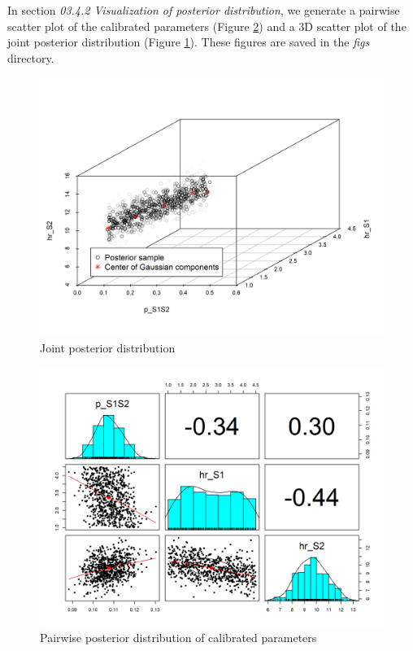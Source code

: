 \documentclass[]{book}
\begin{document}
In section \emph{03.4.2 Visualization of posterior distribution}, we generate a pairwise scatter plot of the calibrated parameters (Figure \ref{fig:03-posterior-distribution-marginal}) and a 3D scatter plot of the joint posterior distribution (Figure \ref{fig:Posterior-distribution-joint}). These figures are saved in the \emph{figs} directory.

\begin{figure}

{\centering \includegraphics[width=1\linewidth]{../figs/03_posterior_distribution_joint} 

}

\caption{Joint posterior distribution}\label{fig:Posterior-distribution-joint}
\end{figure}

\begin{figure}

{\centering \includegraphics[width=1\linewidth]{../figs/03_posterior_distribution_marginal} 

}

\caption{Pairwise posterior distribution of calibrated parameters}\label{fig:03-posterior-distribution-marginal}
\end{figure}
\end{document}
